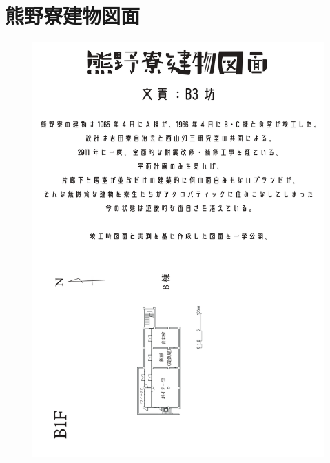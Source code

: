 \section{熊野寮建物図面}\label{sec:熊野寮建物図面}

\begin{figure}[bh]
\centering
\includegraphics[]{gazo/熊野寮建物図面_ver.2_page-0001.jpg}
\end{figure}

